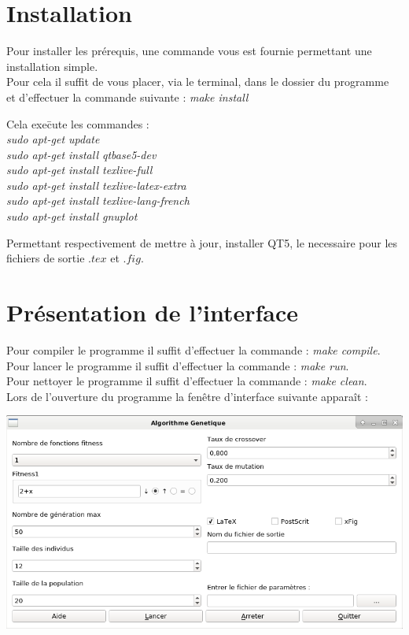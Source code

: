 \documentclass[a4paper,11pt]{article}
\title{\vspace{13em}{\huge Manuel d'utilisation}}
\author{Edouard Fouassier - Maxime Gonthier - Benjamin Guillot\\
		Laureline Martin - Rémi Navarro - Lydia Rodrigez de la Nava
		\vspace{2em}\\
		Algorithme Génétique
		\vspace{2em}}
\begin{document}
\clearpage{}
	\maketitle\vspace{13em}
\newpage
\tableofcontents
\newpage\clearpage

\section{Installation}
Pour installer les prérequis, une commande vous est fournie permettant une installation simple.\\
Pour cela il suffit de vous placer, via le terminal, dans le dossier du programme \\
et d'effectuer la commande suivante : \textit{make install}\\
\begin{tabbing}
Cela exe\=cute les commandes :\\
		\>\textit{sudo apt-get update}\\
		\>\textit{sudo apt-get install qtbase5-dev}\\
		\>\textit{sudo apt-get install texlive-full}\\
		\>\textit{sudo apt-get install texlive-latex-extra}\\
		\>\textit{sudo apt-get install texlive-lang-french}\\
		\>\textit{sudo apt-get install gnuplot}\\
\end{tabbing}
Permettant respectivement de mettre à jour, installer QT5, le necessaire pour les fichiers de sortie $.tex$ et $.fig$.\\


\section{Présentation de l'interface}
Pour compiler le programme il suffit d'effectuer la commande : \textit{make compile}.\\
Pour lancer le programme il suffit d'effectuer la commande : \textit{make run}.\\
Pour nettoyer le programme il suffit d'effectuer la commande : \textit{make clean}.\\
Lors de l'ouverture du programme la fenêtre d'interface suivante apparaît :\\
\centerline{\includegraphics[scale = 0.5]{screen1.png}}
\end{document}
